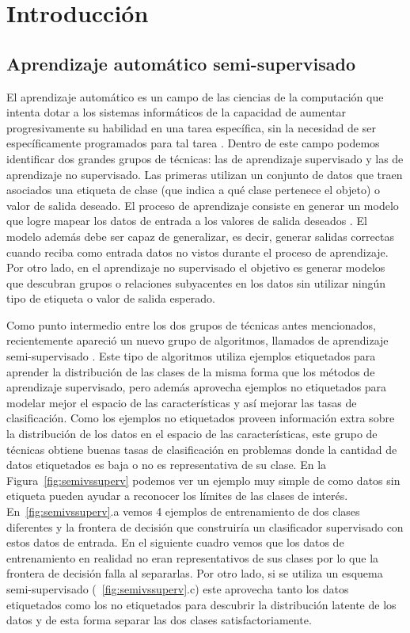 \chapter{Introducción}
\section{Aprendizaje automático semi-supervisado}

El aprendizaje automático es un campo de las ciencias de la computación que intenta dotar a los sistemas informáticos de la capacidad de aumentar
progresivamente su habilidad en una tarea específica, sin la necesidad de ser específicamente programados para tal tarea \citep{samuel1959some}. Dentro de este
campo podemos identificar dos grandes grupos de técnicas: las de aprendizaje supervisado y las de aprendizaje no supervisado. Las primeras utilizan un conjunto
de datos que traen asociados una etiqueta de clase (que indica a qué clase pertenece el objeto) o valor de salida deseado. El proceso de aprendizaje consiste en
generar un modelo que logre mapear los datos de entrada a los valores de salida deseados \citep{russell2016artificial}. El modelo además debe ser capaz de
generalizar, es decir, generar salidas correctas cuando reciba como entrada datos no vistos durante el proceso de aprendizaje. Por otro lado, en el aprendizaje
no supervisado el objetivo es generar modelos que descubran grupos o relaciones subyacentes en los datos sin utilizar ningún tipo de etiqueta o valor de salida
esperado.

Como punto intermedio entre los dos grupos de técnicas antes mencionados, recientemente apareció un nuevo grupo de algoritmos, llamados de aprendizaje
semi-supervisado \citep{chapelle2006semi}. Este tipo de algoritmos utiliza ejemplos etiquetados para aprender la distribución de las clases de la misma forma
que los métodos de aprendizaje supervisado, pero además aprovecha ejemplos no etiquetados para modelar mejor el espacio de las características y así mejorar las
tasas de clasificación. Como los ejemplos no etiquetados proveen información extra sobre la distribución de los datos en el espacio de las características, este
grupo de técnicas obtiene buenas tasas de clasificación en problemas donde la cantidad de datos etiquetados es baja o no es representativa de su clase.  En la
Figura~\ref{fig:semivssuperv} podemos ver un ejemplo muy simple de como datos sin etiqueta pueden ayudar a reconocer los límites de las clases de interés.
En~\ref{fig:semivssuperv}.a vemos 4 ejemplos de entrenamiento de dos clases diferentes y la frontera de decisión que construiría un clasificador supervisado con
estos datos de entrada. En el siguiente cuadro vemos que los datos de entrenamiento en realidad no eran representativos de sus clases por lo que la frontera de
decisión falla al separarlas. Por otro lado, si se utiliza un esquema semi-supervisado (~\ref{fig:semivssuperv}.c) este aprovecha tanto los datos etiquetados
como los no etiquetados para descubrir la distribución latente de los datos y de esta forma separar las dos clases satisfactoriamente.

